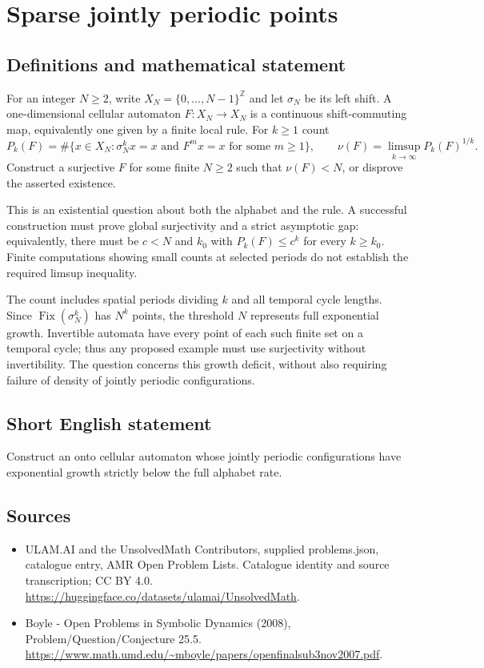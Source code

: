 \documentclass[11pt,a4paper]{article}
\begin{document}
\section*{Sparse jointly periodic points}\label{statement}

\subsection{Definitions and mathematical statement}
For an integer $N\ge2$, write $X_N=\{0,\ldots,N-1\}^{\mathbb Z}$
and let $\sigma_N$ be its left shift. A one-dimensional
cellular automaton $F:X_N\to X_N$ is a continuous shift-commuting
map, equivalently one given by a finite local rule. For $k\ge1$
count
\[
 P_k(F)=\#\{x\in X_N:\sigma_N^k x=x
                    \text{ and }F^m x=x\text{ for some }m\ge1\},
 \qquad \nu(F)=\limsup_{k\to\infty}P_k(F)^{1/k}.
\]
Construct a surjective $F$ for some finite $N\ge2$ such that
$\nu(F)<N$, or disprove the asserted existence.

This is an existential question about both the alphabet and the
rule. A successful construction must prove global surjectivity
and a strict asymptotic gap: equivalently, there must be
$c<N$ and $k_0$ with $P_k(F)\le c^k$ for every $k\ge k_0$.
Finite computations showing small counts at selected periods
do not establish the required limsup inequality.

The count includes spatial periods dividing $k$ and all temporal
cycle lengths. Since $\operatorname{Fix}(\sigma_N^k)$ has
$N^k$ points, the threshold $N$ represents full exponential
growth. Invertible automata have every point of each such finite
set on a temporal cycle; thus any proposed example must use
surjectivity without invertibility. The question concerns this
growth deficit, without also requiring failure of density of
jointly periodic configurations.
\subsection{Short English statement}
Construct an onto cellular automaton whose jointly periodic configurations have exponential growth strictly below the full alphabet rate.
\subsection{Sources}
\begin{itemize}
\item[S1] ULAM.AI and the UnsolvedMath Contributors, supplied problems.json, catalogue entry, AMR Open Problem Lists. Catalogue identity and source transcription; CC BY 4.0.
\url{https://huggingface.co/datasets/ulamai/UnsolvedMath}.
\item[S2] Boyle - Open Problems in Symbolic Dynamics (2008), Problem/Question/Conjecture 25.5. 
\url{https://www.math.umd.edu/~mboyle/papers/openfinalsub3nov2007.pdf}.
\end{itemize}
\end{document}

